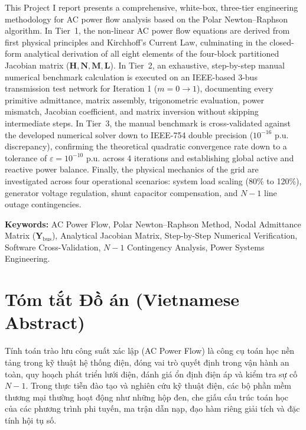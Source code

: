 \documentclass[12pt,a4paper,oneside]{report}
\begin{document}
This Project I report presents a comprehensive, white-box, three-tier engineering methodology for AC power flow analysis based on the Polar Newton--Raphson algorithm. In Tier~1, the non-linear AC power flow equations are derived from first physical principles and Kirchhoff's Current Law, culminating in the closed-form analytical derivation of all eight elements of the four-block partitioned Jacobian matrix ($\mathbf{H}, \mathbf{N}, \mathbf{M}, \mathbf{L}$). In Tier~2, an exhaustive, step-by-step manual numerical benchmark calculation is executed on an IEEE-based 3-bus transmission test network for Iteration 1 ($m = 0 \to 1$), documenting every primitive admittance, matrix assembly, trigonometric evaluation, power mismatch, Jacobian coefficient, and matrix inversion without skipping intermediate steps. In Tier~3, the manual benchmark is cross-validated against the developed numerical solver down to IEEE-754 double precision ($10^{-16}\text{ p.u.}$ discrepancy), confirming the theoretical quadratic convergence rate down to a tolerance of $\varepsilon = 10^{-10}\text{ p.u.}$ across 4 iterations and establishing global active and reactive power balance. Finally, the physical mechanics of the grid are investigated across four operational scenarios: system load scaling (80\% to 120\%), generator voltage regulation, shunt capacitor compensation, and $N-1$ line outage contingencies.

\vspace{10pt}
\noindent \textbf{Keywords:} AC Power Flow, Polar Newton--Raphson Method, Nodal Admittance Matrix ($\mathbf{Y}_{\text{bus}}$), Analytical Jacobian Matrix, Step-by-Step Numerical Verification, Software Cross-Validation, $N-1$ Contingency Analysis, Power Systems Engineering.

\vspace{25pt}
\section*{Tóm tắt Đồ án (Vietnamese Abstract)}
Tính toán trào lưu công suất xác lập (AC Power Flow) là công cụ toán học nền tảng trong kỹ thuật hệ thống điện, đóng vai trò quyết định trong vận hành an toàn, quy hoạch phát triển lưới điện, đánh giá ổn định điện áp và kiểm tra sự cố $N-1$. Trong thực tiễn đào tạo và nghiên cứu kỹ thuật điện, các bộ phần mềm thương mại thường hoạt động như những hộp đen, che giấu cấu trúc toán học của các phương trình phi tuyến, ma trận dẫn nạp, đạo hàm riêng giải tích và đặc tính hội tụ số.
\end{document}
